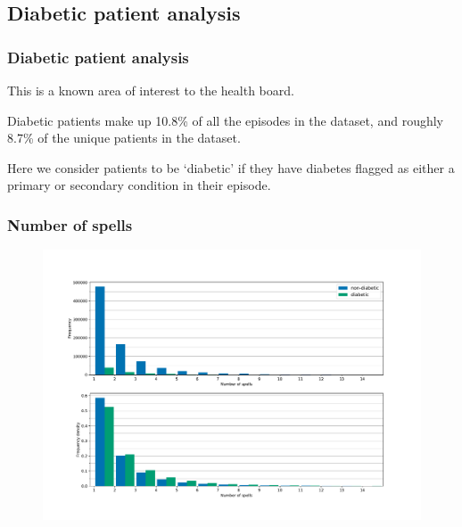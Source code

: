 \documentclass{beamer}
\begin{document}
\subsection{Diabetic patient analysis}

\begin{frame}
    \frametitle{Diabetic patient analysis}

    This is a known area of interest to the health board.

    \vspace{10pt}
    Diabetic patients make up 10.8\% of all the episodes in the dataset, and
    roughly 8.7\% of the unique patients in the dataset.

    \vspace{10pt}
    Here we consider patients to be `diabetic' if they have diabetes flagged as
    either a primary or secondary condition in their episode.
\end{frame}

\begin{frame}
    \frametitle{Number of spells}

    \begin{figure}
    \includegraphics[width=\linewidth]{./img/diabetic_no_spells_joint_hist.pdf}
    \end{figure}
\end{frame}
\end{document}
